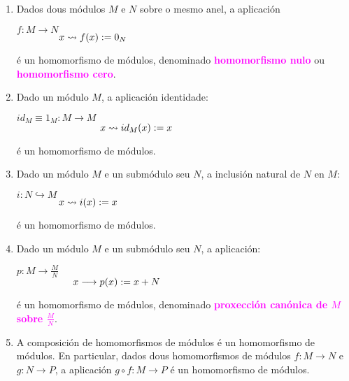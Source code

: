 \documentclass[twoside]{report}
\newcommand{\magbf}[1]{\textcolor{magenta}{\textbf{#1}}} %
\theoremstyle{mystyle}
\begin{document}
\begin{enumerate}
    \item Dados dous módulos $M$ e $N$ sobre o mesmo anel, a aplicación
    \begin{center}
        $f: M \longrightarrow N$\\
        \vspace{2mm}
        $\hspace{15mm} x \leadsto f(x) := 0_{N}$
    \end{center}
    é un homomorfismo de módulos, denominado \magbf{homomorfismo nulo} ou \magbf{homomorfismo cero}.
    \item Dado un módulo $M$, a aplicación identidade:
    \begin{center}
        $id_{M} \equiv 1_{M}: M \longrightarrow M$\\
        \vspace{2mm}
        $\hspace{30mm} x \leadsto id_{M}(x) := x$
    \end{center}
    é un homomorfismo de módulos.
    \item Dado un módulo $M$ e un submódulo seu $N$, a inclusión natural de $N$ en $M$:
    \begin{center}
        $i: N \hookrightarrow M$\\
        \vspace{2mm}
        $\hspace{15mm} x \leadsto i(x) := x$
    \end{center}
    é un homomorfismo de módulos.
    \item Dado un módulo $M$ e un submódulo seu $N$, a aplicación:
    \begin{center}
        $p: M \longrightarrow \displaystyle \frac{M}{N}$\\
        \vspace{2mm}
        $\hspace{20mm} x \longrightarrow p(x) := x + N$
    \end{center}
    é un homomorfismo de módulos, denominado \magbf{proxección canónica de $M$ sobre $\displaystyle \frac{M}{N}$}.
    \item A composición de homomorfismos de módulos é un homomorfismo de módulos. En particular, dados dous homomorfismos de módulos $f:M \longrightarrow N$ e $g: N \longrightarrow P$, a aplicación $g \circ f: M \longrightarrow P$ é un homomorfismo de módulos.
    \end{enumerate}

\vspace{3mm}
\end{document}
